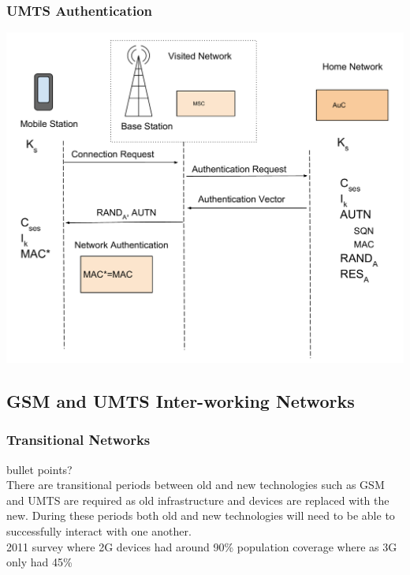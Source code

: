 \documentclass{beamer}
\begin{document}
	\begin{frame}
	\frametitle{UMTS Authentication}
  \begin{center}
  \includegraphics[width=.9\textwidth, height=.85\textheight]{Images/UMTSAuthentication3.pdf}

  \end{center} 
	\end{frame}
\subsection{GSM and UMTS Inter-working Networks}
\begin{frame}
	\frametitle{Transitional Networks}
	
	 bullet points?\\
		There are transitional periods between old and new technologies such as GSM and UMTS are required as old infrastructure and devices are replaced with the new. During these periods both old and new technologies will need to be able to successfully interact with one another.
		\\2011 survey where 2G devices had around 90\% population coverage where as 3G only had 45\%
\end{frame}
\end{document}
